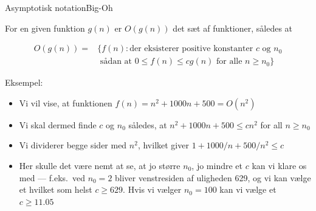 \documentclass{beamer}
\begin{document}
\begin{frame}{Asymptotisk notation}{Big-Oh}
    \begin{definition}[Big-Oh, $O$]
        For en given funktion $g(n)$ er $O(g(n))$ det sæt af funktioner, således
        at

        \vspace{-\abovedisplayskip}
        \begin{align*}
            O(g(n)){} =&\{ f(n) : \text{der eksisterer positive konstanter } c
                \text{~og~} n_0 \\
                       &\text{~sådan at~} 0 \leq f(n) \leq cg(n) \text{~for
                   alle~} n \geq n_0 \}
        \end{align*}
    \end{definition}

    Eksempel:
    \pause
    \begin{itemize}[<+->]
        \small
        \item Vi vil vise, at funktionen $f(n) = n^2 + 1000n + 500 = O(n^2)$
        \item Vi skal dermed finde $c$ og $n_0$ således, at $n^2 + 1000n + 500
            \leq cn^2$ for all $n \geq n_0$
        \item Vi dividerer begge sider med $n^2$, hvilket giver $1 + 1000/n +
            500/n^2 \leq c$
        \item Her skulle det være nemt at se, at jo større $n_0$, jo mindre et $c$
            kan vi klare os med --- f.eks.\ ved $n_0 = 2$ bliver venstresiden af
            uligheden 629, og vi kan vælge et hvilket som helst $c \geq 629$.
            Hvis vi vælger $n_0 = 100$ kan vi vælge et $c \geq 11.05$
    \end{itemize}
\end{frame}
\end{document}
